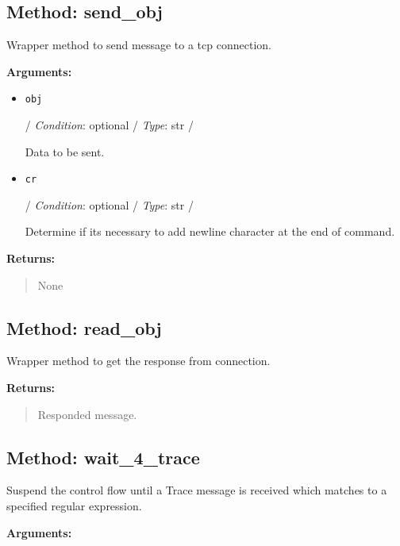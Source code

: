 \hypertarget{qconnectbase-connection-base-method-send_obj-10}{%
\subsection{Method: send\_obj}\label{qconnectbase-connection-base-method-send_obj-10}}

Wrapper method to send message to a tcp connection.

\textbf{Arguments:}

\begin{itemize}
\item
  \texttt{obj}

  / \emph{Condition}: optional / \emph{Type}: str /

  Data to be sent.
\item
  \texttt{cr}

  / \emph{Condition}: optional / \emph{Type}: str /

  Determine if it\textquotesingle s necessary to add newline character
  at the end of command.
\end{itemize}

\textbf{Returns:}

\begin{quote}
None
\end{quote}

\hypertarget{qconnectbase-connection-base-method-read_obj-11}{%
\subsection{Method: read\_obj}\label{qconnectbase-connection-base-method-read_obj-11}}

Wrapper method to get the response from connection.

\textbf{Returns:}

\begin{quote}
Responded message.
\end{quote}

\hypertarget{qconnectbase-connection-base-method-wait_4_trace-12}{%
\subsection{Method: wait\_4\_trace}\label{qconnectbase-connection-base-method-wait_4_trace-12}}

Suspend the control flow until a Trace message is received which matches
to a specified regular expression.

\textbf{Arguments:}

